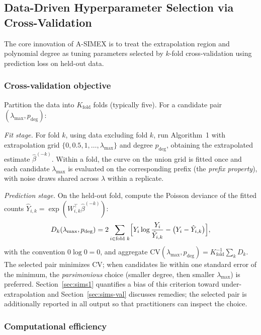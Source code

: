 \documentclass[3p,11pt]{elsarticle}
\theoremstyle{plain}
\theoremstyle{definition}
\begin{document}
\subsection{Data-Driven Hyperparameter Selection via
Cross-Validation}\label{sec:cv}

The core innovation of A-SIMEX is to treat the extrapolation region
and polynomial degree as tuning parameters selected by $k$-fold
cross-validation using prediction loss on held-out data.

\subsubsection*{Cross-validation objective}

Partition the data into $K_{\mathrm{fold}}$ folds (typically five). For
a candidate pair $(\lambda_{\max},p_{\mathrm{deg}})$:

\emph{Fit stage.} For fold $k$, using data excluding fold $k$, run
Algorithm~1 with extrapolation grid $\{0,0.5,1,\dots,\lambda_{\max}\}$ and
degree $p_{\mathrm{deg}}$, obtaining the extrapolated estimate
$\hat\beta^{(-k)}$. Within a fold, the curve on the union grid is
fitted once and each candidate $\lambda_{\max}$ is evaluated on the
corresponding prefix (the \emph{prefix property}), with noise
draws shared across $\lambda$ within a replicate.

\emph{Prediction stage.} On the held-out fold, compute the Poisson
deviance of the fitted counts
$\hat Y_{i,k}=\exp(W_{i,k}^\top\hat\beta^{(-k)})$:
\begin{equation}\label{eq:cv}
  D_k(\lambda_{\max},p_{\mathrm{deg}})
  =2\sum_{i\in\text{fold }k}\Bigl[
    Y_i\log\frac{Y_i}{\hat Y_{i,k}}-\bigl(Y_i-\hat Y_{i,k}\bigr)\Bigr],
\end{equation}
with the convention $0\log0=0$, and aggregate
$\mathrm{CV}(\lambda_{\max},p_{\mathrm{deg}})
=K_{\mathrm{fold}}^{-1}\sum_kD_k$. The selected pair minimizes
$\mathrm{CV}$; when candidates lie within one standard error of the
minimum, the \emph{parsimonious} choice (smaller degree, then smaller
$\lambda_{\max}$) is preferred. Section~\ref{sec:sims1} quantifies a
bias of this criterion toward under-extrapolation and
Section~\ref{sec:sims-val} discusses remedies; the selected pair is
additionally reported in all output so that practitioners can inspect
the choice.

\subsubsection*{Computational efficiency}
\end{document}

